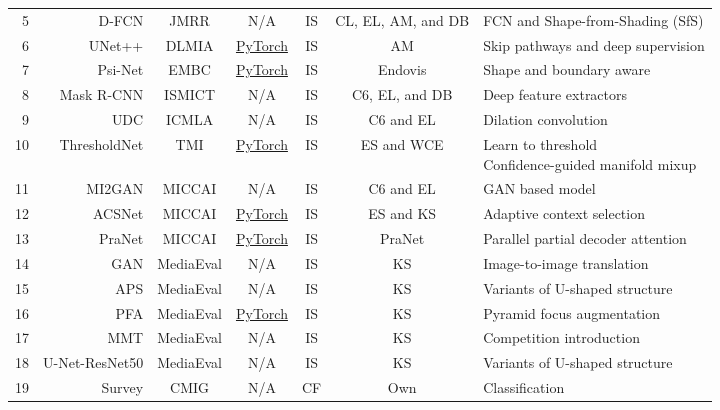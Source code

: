 \documentclass[journal]{IEEEtran}
\begin{document}
\begin{table*}[t!]
\begin{tabular}{r|r|c|c|c|c|l}
    5&D-FCN  & JMRR  & N/A    &  IS     & CL, EL, AM, and DB   & FCN and Shape-from-Shading (SfS)\\
    
   6 &UNet++ &DLMIA    & \href{https://github.com/MrGiovanni/UNetPlusPlus}{PyTorch} &   IS    & AM & Skip pathways and deep supervision\\  
    
    7&Psi-Net& EMBC   & \href{https://github.com/Bala93/Multi-task-deep-network}{PyTorch} &   IS    & Endovis &  Shape and boundary aware\\  
    
   8& Mask R-CNN & ISMICT  & N/A &   IS    & C6, EL, and DB &  Deep feature extractors \\ 
    
   9 &UDC & ICMLA    & N/A &   IS    & C6 and EL &  Dilation convolution \\
    
    10&ThresholdNet & TMI     & \href{https://github.com/Guo-Xiaoqing/ThresholdNet}{PyTorch} &     IS  & ES and WCE   & \makecell[l]{Learn to threshold \\ Confidence-guided manifold mixup} \\
    
    11&MI2GAN  & MICCAI   & N/A    & IS      &C6 and EL  & GAN based model\\
   12 &ACSNet   & MICCAI  & \href{https://github.com/ReaFly/ACSNet }{PyTorch}& IS       &ES and KS   &  Adaptive context selection\\
    13&PraNet & MICCAI  & \href{https://github.com/DengPingFan/PraNet}{PyTorch} &  IS     & PraNet & Parallel partial decoder attention\\
    14&GAN  & MediaEval   & N/A    & IS      &  KS &  Image-to-image translation\\
    15&APS   & MediaEval   & N/A    &      IS & KS &Variants of U-shaped structure\\
    16&PFA & MediaEval  & \href{https://github.com/vlbthambawita/pyra-pytorch}{PyTorch} &   IS    & KS &  Pyramid focus augmentation\\
    17&MMT  & MediaEval  & N/A    &   IS    & KS & Competition introduction \\
    
    18&U-Net-ResNet50 & MediaEval   & N/A    & IS       &  KS & Variants of U-shaped structure\\
    19&Survey & CMIG  & N/A  & CF     & Own & Classification \\
    

\end{tabular}
\end{table*}
\end{document}
